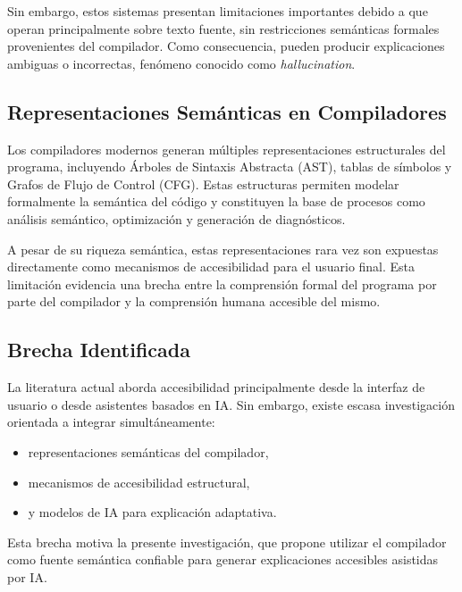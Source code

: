 \documentclass[conference]{IEEEtran}
\begin{document}
Sin embargo, estos sistemas presentan limitaciones importantes debido a que operan principalmente sobre texto fuente, sin restricciones semánticas formales provenientes del compilador. Como consecuencia, pueden producir explicaciones ambiguas o incorrectas, fenómeno conocido como \textit{hallucination}.

\subsection{Representaciones Semánticas en Compiladores}

Los compiladores modernos generan múltiples representaciones estructurales del programa, incluyendo Árboles de Sintaxis Abstracta (AST), tablas de símbolos y Grafos de Flujo de Control (CFG). Estas estructuras permiten modelar formalmente la semántica del código y constituyen la base de procesos como análisis semántico, optimización y generación de diagnósticos.

A pesar de su riqueza semántica, estas representaciones rara vez son expuestas directamente como mecanismos de accesibilidad para el usuario final. Esta limitación evidencia una brecha entre la comprensión formal del programa por parte del compilador y la comprensión humana accesible del mismo.

\subsection{Brecha Identificada}

La literatura actual aborda accesibilidad principalmente desde la interfaz de usuario o desde asistentes basados en IA. Sin embargo, existe escasa investigación orientada a integrar simultáneamente:

\begin{itemize}
    \item representaciones semánticas del compilador,
    \item mecanismos de accesibilidad estructural,
    \item y modelos de IA para explicación adaptativa.
\end{itemize}

Esta brecha motiva la presente investigación, que propone utilizar el compilador como fuente semántica confiable para generar explicaciones accesibles asistidas por IA.
\end{document}
